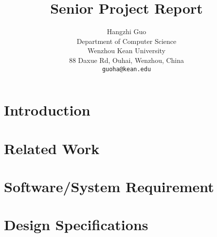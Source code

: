 \documentclass[12pt]{article}
\title{Senior Project Report}
\author{
  Hangzhi Guo \\
  Department of Computer Science\\
  Wenzhou Kean University\\
  88 Daxue Rd, Ouhai, Wenzhou, China \\
  \texttt{guoha@kean.edu} \\
}
\begin{document}
    
    \pagebreak
    

    
    \pagebreak

    
    \pagebreak

    \tableofcontents
    \vfill
    \pagebreak



    \section{Introduction}
    

    \section{Related Work}
    

    \section{Software/System Requirement}
    

    \section{Design Specifications}
    
\end{document}
